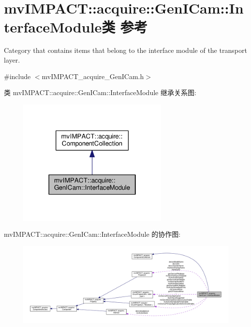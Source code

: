 \hypertarget{classmv_i_m_p_a_c_t_1_1acquire_1_1_gen_i_cam_1_1_interface_module}{\section{mv\+I\+M\+P\+A\+C\+T\+:\+:acquire\+:\+:Gen\+I\+Cam\+:\+:Interface\+Module类 参考}
\label{classmv_i_m_p_a_c_t_1_1acquire_1_1_gen_i_cam_1_1_interface_module}
}


Category that contains items that belong to the interface module of the transport layer.  




{\ttfamily \#include $<$mv\+I\+M\+P\+A\+C\+T\+\_\+acquire\+\_\+\+Gen\+I\+Cam.\+h$>$}



类 mv\+I\+M\+P\+A\+C\+T\+:\+:acquire\+:\+:Gen\+I\+Cam\+:\+:Interface\+Module 继承关系图\+:
\nopagebreak
\begin{figure}[H]
\begin{center}
\leavevmode
\includegraphics[width=214pt]{classmv_i_m_p_a_c_t_1_1acquire_1_1_gen_i_cam_1_1_interface_module__inherit__graph}
\end{center}
\end{figure}


mv\+I\+M\+P\+A\+C\+T\+:\+:acquire\+:\+:Gen\+I\+Cam\+:\+:Interface\+Module 的协作图\+:
\nopagebreak
\begin{figure}[H]
\begin{center}
\leavevmode
\includegraphics[width=350pt]{classmv_i_m_p_a_c_t_1_1acquire_1_1_gen_i_cam_1_1_interface_module__coll__graph}
\end{center}
\end{figure}
